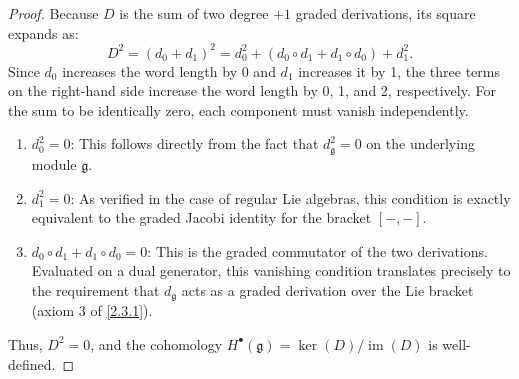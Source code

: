 \begin{proof}
    Because $D$ is the sum of two degree $+1$ graded derivations, its square expands as:
    \[
        D^2 = (d_0 + d_1)^2 = d_0^2 + (d_0 \circ d_1 + d_1 \circ d_0) + d_1^2.
    \]
    Since $d_0$ increases the word length by 0 and $d_1$ increases it by 1, the three terms on the right-hand side increase the word length by 0, 1, and 2, respectively. For the sum to be identically zero, each component must vanish independently.
    
    \begin{enumerate}
        \item $d_0^2 = 0$: This follows directly from the fact that $d_\mathfrak{g}^2 = 0$ on the underlying module $\mathfrak{g}$.
        \item $d_1^2 = 0$: As verified in the case of regular Lie algebras, this condition is exactly equivalent to the graded Jacobi identity for the bracket $[-,-]$.
        \item $d_0 \circ d_1 + d_1 \circ d_0 = 0$: This is the graded commutator of the two derivations. Evaluated on a dual generator, this vanishing condition translates precisely to the requirement that $d_\mathfrak{g}$ acts as a graded derivation over the Lie bracket (axiom 3 of \cref{2.3.1}).
    \end{enumerate}
    Thus, $D^2 = 0$, and the cohomology $H^\bullet(\mathfrak{g}) = \ker(D)/\operatorname{im}(D)$ is well-defined.
\end{proof}


